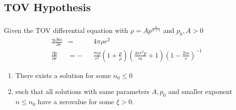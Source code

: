 \subsection{TOV Hypothesis}
\begin{frame}
	\frametitle{\insertsubsection}
	\begin{hypothesis}
		Given the TOV differential equation with $\rho=Ap^{\frac{n}{n+1}}$ and $p_0,A>0$
		\begin{alignat*}{3}
			\frac{\partial m}{\partial r} &= &&4\pi\rho r^2\\
			\frac{\partial p}{\partial r} &= -&&\frac{m\rho}{r^2}\left(1+\frac{p}{\rho}\right)\left(\frac{4\pi r^3p}{m}+1\right)\left(1-\frac{2m}{r}\right)^{-1}
		\end{alignat*}
		\begin{enumerate}
			\item There exists a solution for some $n_0\leq0$
			\item such that all solutions with same parameters $A,p_0$ and smaller exponent $n\leq n_0$ have a zerovalue for some $\xi>0$.
		\end{enumerate}
% 
% 		
% 		
	\end{hypothesis}
\end{frame}


% 		
